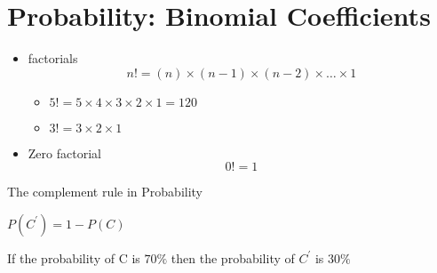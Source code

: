 \documentclass[]{report}
\begin{document}
\section*{Probability: Binomial Coefficients}
\begin{itemize}
\item factorials 
\[ n! = (n)\times (n-1)\times(n-2) \times \ldots \times 1 \]
\begin{itemize}
\item $5! = 5 \times 4 \times 3 \times 2 \times 1 = 120 $
\item $3! = 3 \times 2 \times 1$
\end{itemize}
\item Zero factorial
\[ 0! =  1 \]
\end{itemize}


The complement rule in Probability

$P(C^{\prime}) = 1- P(C)$



If the probability of C is $70 \%$ then the probability of $C^{\prime}$ is $30\%$
\end{document}
